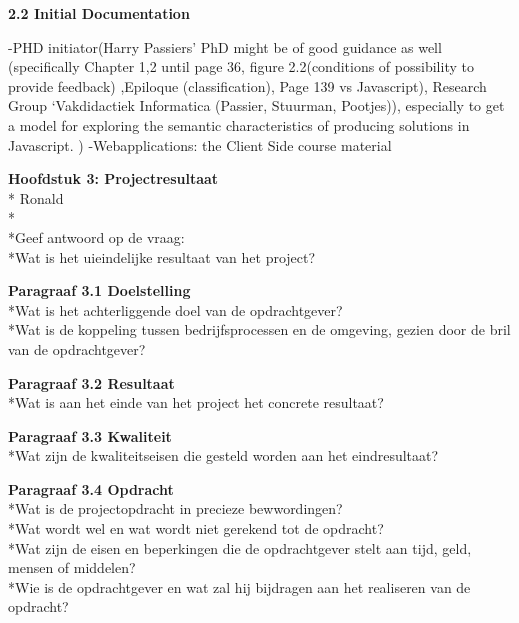 \documentclass{article}
\begin{document}
\textbf{2.2 Initial Documentation}

\noindent
-PHD initiator(Harry Passiers’ PhD might be of good guidance as well (specifically Chapter 1,2 until page 36, figure 2.2(conditions of possibility to provide feedback) ,Epiloque (classification), Page 139 vs Javascript), Research Group ‘Vakdidactiek Informatica (Passier, Stuurman, Pootjes)), especially to get a model for exploring the semantic characteristics of producing solutions in Javascript. )
\newline-Webapplications: the Client Side course material

\textbf{Hoofdstuk 3: Projectresultaat}
\\* Ronald
\\*
\\*Geef antwoord op de vraag:
\\*Wat is het uieindelijke resultaat van het project?
\newline

\noindent
\textbf{Paragraaf 3.1 Doelstelling}
\\*Wat is het achterliggende doel van de opdrachtgever?
\\*Wat is de koppeling tussen bedrijfsprocessen en de omgeving, gezien door de bril van de opdrachtgever?
\newline

\noindent
\textbf{Paragraaf 3.2 Resultaat}
\\*Wat is aan het einde van het project het concrete resultaat?
\newline

\noindent
\textbf{Paragraaf 3.3 Kwaliteit}
\\*Wat zijn de kwaliteitseisen die gesteld worden aan het eindresultaat?
\newline

\noindent
\textbf{Paragraaf 3.4 Opdracht}
\\*Wat is de projectopdracht in precieze bewwordingen?
\\*Wat wordt wel en wat wordt niet gerekend tot de opdracht?
\\*Wat zijn de eisen en beperkingen die de opdrachtgever stelt aan tijd, geld, mensen of middelen?
\\*Wie is de opdrachtgever en wat zal hij bijdragen aan het realiseren van de opdracht?
\newline
\end{document}
